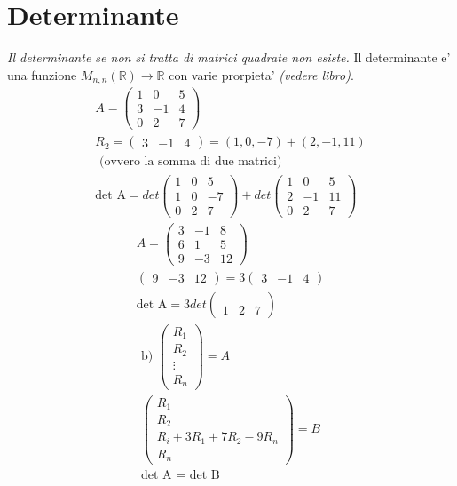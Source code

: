 \documentclass[a4paper,12pt]{article}
\begin{document}
\section{Determinante}
\textit{Il determinante se non si tratta di matrici quadrate non esiste.}
Il determinante e' una funzione $M_{n,n}(\mathbb{R})\to \mathbb{R}$ con varie prorpieta' \textit{(vedere libro)}.
\begin{align*}
    A= \begin{pmatrix}
        1 & 0 & 5 \\
        3 & -1 & 4 \\
        0 & 2 & 7
    \end{pmatrix}
    \\ R_2=\begin{pmatrix}
        3 & -1 & 4
    \end{pmatrix}
    =(1,0,-7)+(2,-1,11) 
    \\\text{ (ovvero la somma di due matrici)}
    \\\text{det A}=det\begin{pmatrix}
        1 & 0 & 5 \\ 1 & 0 & -7 \\ 0 & 2 & 7
    \end{pmatrix} + 
    det\begin{pmatrix}
        1 & 0 & 5 \\ 2 & -1 & 11 \\ 0 & 2 & 7
    \end{pmatrix}
\end{align*}
\begin{align*}
    A=\begin{pmatrix}
        3 & -1 & 8 \\ 6 & 1 & 5 \\ 9 & -3 & 12
    \end{pmatrix}
    \\ \begin{pmatrix}
        9 & -3 & 12
    \end{pmatrix}
    =3\begin{pmatrix}
        3 & -1 & 4
    \end{pmatrix}
    \\\text{det A}=3det\begin{pmatrix}
        \\
        \\
        1 & 2 & 7
    \end{pmatrix}
\end{align*}
\begin{align*}
    \text{b) }
    \begin{pmatrix}
        R_1 \\ R_2 \\ \vdots \\ R_n
    \end{pmatrix} = A
    \\ \begin{pmatrix}
        R_1 \\
        R_2 \\
        R_i+3R_1+7R_2-9R_n \\
        R_n
    \end{pmatrix} = B
    \\ \text{det A = det B}
\end{align*}
\end{document}
